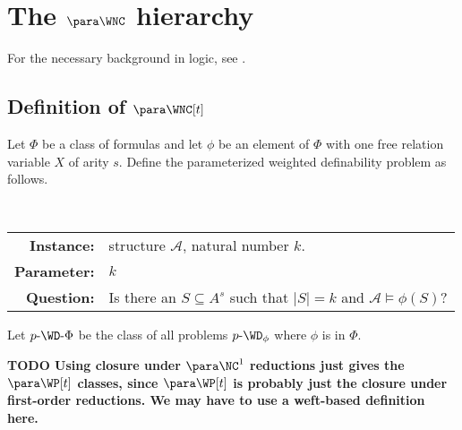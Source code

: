 \documentclass{article}
\newcommand{\todo}[1]{\textbf{TODO #1}}
\newcommand{\dash}{\textnormal{-}}
\begin{document}
\section{The \texorpdfstring{$\para \WNC$}{paraWNC} hierarchy}

For the necessary background in logic, see \autocite[Chapter~4]{fg06}.

\subsection{Definition of \texorpdfstring{$\para \WNC[t]$}{paraWNC[t]}}

Let $\Phi$ be a class of formulas and let $\phi$ be an element of $\Phi$ with one free relation variable $X$ of arity $s$.
Define the parameterized weighted definability problem as follows.


\begin{definition}[{$p \dash \WD_\phi$ \autocite[Section~5.1]{fg06}}]
  \mbox{} \\
  \begin{tabular}{r p{9.2cm}}
    \textbf{Instance:} & structure $\mathcal{A}$, natural number $k$. \\
    \textbf{Parameter:} & $k$ \\
    \textbf{Question:} & Is there an $S \subseteq A^s$ such that $|S| = k$ and $\mathcal{A} \models \phi(S)$?
  \end{tabular}
\end{definition}

Let $p \dash \WD \dash \Phi$ be the class of all problems $p \dash \WD_\phi$ where $\phi$ is in $\Phi$.

\todo{
  Using closure under $\para \NC^1$ reductions just gives the $\para \WP[t]$ classes, since $\para \WP[t]$ is probably just the closure under first-order reductions.
  We may have to use a weft-based definition here.
}

\end{document}
